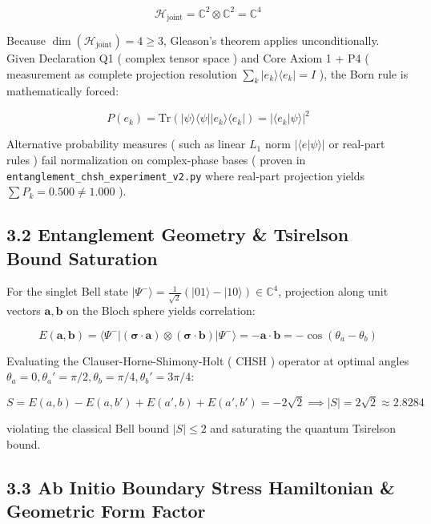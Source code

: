 \documentclass[11pt,a4paper]{article}
\theoremstyle{definition}\newtheorem{definition}{Definition}
\theoremstyle{remark}\newtheorem{remark}{Remark}
\begin{document}
\begin{equation}
\mathcal{H}_{\text{joint}} = \mathbb{C}^2 \otimes \mathbb{C}^2 = \mathbb{C}^4
\end{equation}


Because $\dim(\mathcal{H}_{\text{joint}}) = 4 \ge 3$, Gleason's theorem applies unconditionally. Given Declaration Q1 ( complex tensor space ) and Core Axiom 1 + P4 ( measurement as complete projection resolution $\sum_k |e_k\rangle\langle e_k| = I$ ), the Born rule is mathematically forced:


\begin{equation}
P(e_k) = \text{Tr}(|\psi\rangle\langle\psi| |e_k\rangle\langle e_k|) = |\langle e_k | \psi \rangle|^2
\end{equation}


Alternative probability measures ( such as linear $L_1$ norm $|\langle e | \psi \rangle|$ or real-part rules ) fail normalization on complex-phase bases ( proven in \texttt{entanglement_chsh_experiment_v2.py} where real-part projection yields $\sum P_k = 0.500 \neq 1.000$ ).
\subsection{3.2 Entanglement Geometry \& Tsirelson Bound Saturation}

For the singlet Bell state $|\Psi^-\rangle = \frac{1}{\sqrt{2}}(|01\rangle - |10\rangle) \in \mathbb{C}^4$, projection along unit vectors $\mathbf{a}, \mathbf{b}$ on the Bloch sphere yields correlation:


\begin{equation}
E(\mathbf{a}, \mathbf{b}) = \langle \Psi^- | (\boldsymbol{\sigma} \cdot \mathbf{a}) \otimes (\boldsymbol{\sigma} \cdot \mathbf{b}) | \Psi^- \rangle = -\mathbf{a} \cdot \mathbf{b} = -\cos(\theta_a - \theta_b)
\end{equation}


Evaluating the Clauser-Horne-Shimony-Holt ( CHSH ) operator at optimal angles $\theta_a = 0, \theta_a' = \pi/2, \theta_b = \pi/4, \theta_b' = 3\pi/4$:


\begin{equation}
S = E(a, b) - E(a, b') + E(a', b) + E(a', b') = -2\sqrt{2} \implies |S| = 2\sqrt{2} \approx 2.8284
\end{equation}


violating the classical Bell bound $|S| \le 2$ and saturating the quantum Tsirelson bound.
\subsection{3.3 Ab Initio Boundary Stress Hamiltonian \& Geometric Form Factor}
\end{document}
